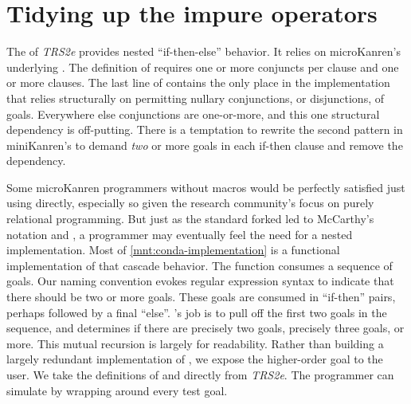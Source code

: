 \documentclass[sigplan,balance=true,pbalance=true,natbib=false]{acmart}
\begin{document}
\section{Tidying up the impure operators}\label{sec:impure}

The  of \emph{TRS2e} provides nested
\enquote{if-then-else} behavior. It relies on microKanren's
underlying . The definition of 
requires one or more conjuncts per clause and one or more clauses. The
last line of  contains the only place in the
implementation that relies structurally on permitting nullary
conjunctions, or disjunctions, of goals. Everywhere else conjunctions
are one-or-more, and this one structural dependency is off-putting.
There is a temptation to rewrite the second pattern in
miniKanren's  to demand \emph{two} or more goals in
each if-then clause and remove the dependency.

Some microKanren programmers without macros would be perfectly
satisfied just using  directly, especially so given
the research community's focus on purely relational programming. But
just as the standard forked  led to
McCarthy's  notation and , a
programmer may eventually feel the need for a nested implementation.
Most of \cref{mnt:conda-implementation} is a functional implementation
of that cascade behavior. The  function consumes a
sequence of goals. Our  naming convention evokes
regular expression syntax to indicate that there should be two or more
goals. These goals are consumed in \enquote{if-then} pairs, perhaps
followed by a final \enquote{else}. 's job is to pull
off the first two goals in the sequence, and  determines
if there are precisely two goals, precisely three goals, or more.
This mutual recursion is largely for readability. Rather than building
a largely redundant implementation of , we expose
the higher-order goal  to the user. We take the
definitions of  and  directly from
\emph{TRS2e}. The programmer can simulate  by
wrapping  around every test goal.
\end{document}
